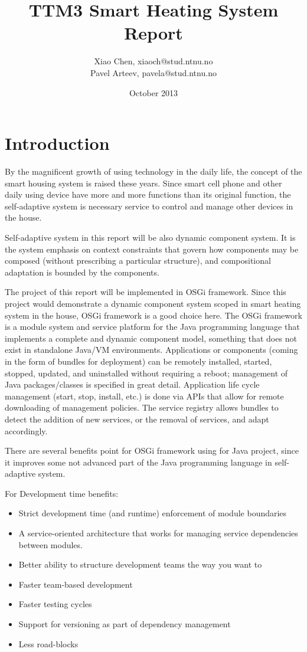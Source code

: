 \documentclass{article}
\title{TTM3 Smart Heating System Report}
\author{Xiao Chen, xiaoch@stud.ntnu.no\\
Pavel Arteev, pavela@stud.ntnu.no}
\date{October 2013}
\begin{document}
\maketitle

\section{Introduction}
	
\par By the magnificent growth of using technology in the daily life, the concept of the smart housing system is raised these years. Since smart cell phone and other daily using device have more and more functions  than its original function, the self-adaptive system is necessary service to control and manage other devices in the house.

\par Self-adaptive system in this report will be also dynamic component system. It is the system emphasis on context constraints that govern how components may be composed (without prescribing a particular structure), and compositional adaptation is bounded by the components.

\par The project of this report will be implemented in OSGi\cite{osgi} framework. Since this project would demonstrate a dynamic component system scoped in smart heating system in the house, OSGi framework is a good choice here. The OSGi framework is a module system and service platform for the Java programming language that implements a complete and dynamic component model, something that does not exist in standalone Java/VM environments. Applications or components (coming in the form of bundles for deployment) can be remotely installed, started, stopped, updated, and uninstalled without requiring a reboot; management of Java packages/classes is specified in great detail. Application life cycle management (start, stop, install, etc.) is done via APIs that allow for remote downloading of management policies. The service registry allows bundles to detect the addition of new services, or the removal of services, and adapt accordingly.

\par There are several benefits point for OSGi framework using for Java project, since it improves some not advanced part of the Java programming language in self-adaptive system.
\par For Development time benefits\cite{osgi_benefit}:
\begin{itemize}
  	\item Strict development time (and runtime) enforcement of module boundaries
	\item A service-oriented architecture that works for managing service dependencies between modules.
	\item Better ability to structure development teams the way you want to
	\item Faster team-based development
	\item Faster testing cycles
	\item Support for versioning as part of dependency management
	\item Less road-blocks
  \end{itemize}
  
\end{document}
